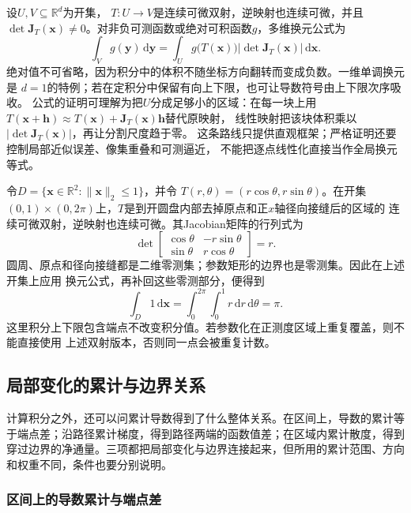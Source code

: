 设$U,V\subseteq\mathbb{R}^d$为开集， $T:U\to V$是连续可微双射，逆映射也连续可微，并且 $\det\bm{J}_T(\bm{x})\neq0$。对非负可测函数或绝对可积函数$g$，多维换元公式为
\begin{equation}
  \int_V g(\bm{y})\,\mathrm{d}\bm{y}
  =
  \int_U
  g\bigl(T(\bm{x})\bigr)
  \left|\det\bm{J}_T(\bm{x})\right|
  \,\mathrm{d}\bm{x}.
\label{eq:analysis-multivariate-change-variables}
\end{equation}
绝对值不可省略，因为积分中的体积不随坐标方向翻转而变成负数。一维单调换元是 $d=1$的特例；若在定积分中保留有向上下限，也可让导数符号由上下限次序吸收。
公式的证明可理解为把$U$分成足够小的区域：在每一块上用
$T(\bm{x}+\bm{h})\approx T(\bm{x})+\bm{J}_T(\bm{x})\bm{h}$替代原映射，
线性映射把该块体积乘以$|\det\bm{J}_T(\bm{x})|$，再让分割尺度趋于零。
这条路线只提供直观框架；严格证明还要控制局部近似误差、像集重叠和可测逼近，
不能把逐点线性化直接当作全局换元等式。
\begin{example}[极坐标中的面积权重]
\label{ex:analysis-polar-coordinate-jacobian}
令$D=\{\bm{x}\in\mathbb{R}^2:\lVert\bm{x}\rVert_2\leq1\}$，并令
$T(r,\theta)=(r\cos\theta,r\sin\theta)$。在开集
$(0,1)\times(0,2\pi)$上，$T$是到开圆盘内部去掉原点和正$x$轴径向接缝后的区域的
连续可微双射，逆映射也连续可微。其Jacobian矩阵的行列式为
\[   \det
\begin{bmatrix}     \cos\theta & -r\sin\theta\\     \sin\theta & r\cos\theta
\end{bmatrix}   =r. \]
圆周、原点和径向接缝都是二维零测集；参数矩形的边界也是零测集。因此在上述开集上应用
换元公式，再补回这些零测部分，便得到
\[   \int_D1\,\mathrm{d}\bm{x}   =   \int_0^{2\pi}\int_0^1r\,\mathrm{d}r\,\mathrm{d}\theta   =\pi. \]
这里积分上下限包含端点不改变积分值。若参数化在正测度区域上重复覆盖，则不能直接使用
上述双射版本，否则同一点会被重复计数。
\end{example}
\subsection{局部变化的累计与边界关系}

计算积分之外，还可以问累计导数得到了什么整体关系。在区间上，导数的累计等于端点差；沿路径累计梯度，得到路径两端的函数值差；在区域内累计散度，得到穿过边界的净通量。三项都把局部变化与边界连接起来，但所用的累计范围、方向和权重不同，条件也要分别说明。

\subsubsection{区间上的导数累计与端点差}
\label{sec:analysis-integration-remainders}

